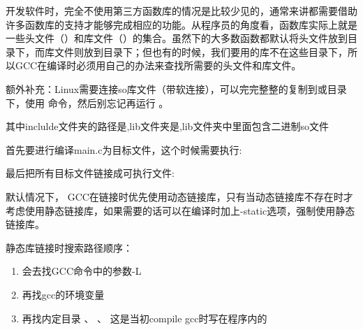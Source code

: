 \documentclass[letterpaper,12pt,english]{sphinxmanual}
\begin{document}
\begin{DUlineblock}{0em}
\item[] 开发软件时，完全不使用第三方函数库的情况是比较少见的，通常来讲都需要借助许多函数库的支持才能够完成相应的功能。从程序员的角度看，函数库实际上就是一些头文件（）和库文件（）的集合。虽然下的大多数函数都默认将头文件放到目录下，而库文件则放到目录下；但也有的时候，我们要用的库不在这些目录下，所以GCC在编译时必须用自己的办法来查找所需要的头文件和库文件。
\item[] 额外补充：Linux需要连接so库文件（带软连接），可以完完整整的复制到或目录下，使用
 命令，然后别忘记再运行
。
\end{DUlineblock}

\begin{DUlineblock}{0em}
\item[] 其中inclulde文件夹的路径是,lib文件夹是,lib文件夹中里面包含二进制so文件
\item[] 首先要进行编译main.c为目标文件，这个时候需要执行:
\item[] 
\item[] 最后把所有目标文件链接成可执行文件:
\item[] 
\end{DUlineblock}

\begin{DUlineblock}{0em}
\item[] 默认情况下，
GCC在链接时优先使用动态链接库，只有当动态链接库不存在时才考虑使用静态链接库，如果需要的话可以在编译时加上-static选项，强制使用静态链接库。
\item[] 
\end{DUlineblock}

静态库链接时搜索路径顺序：
\begin{enumerate}
%
\item {} 
会去找GCC命令中的参数-L

\item {} 
再找gcc的环境变量

\item {} 
再找内定目录 、 、
 这是当初compile gcc时写在程序内的

\end{enumerate}
\end{document}
